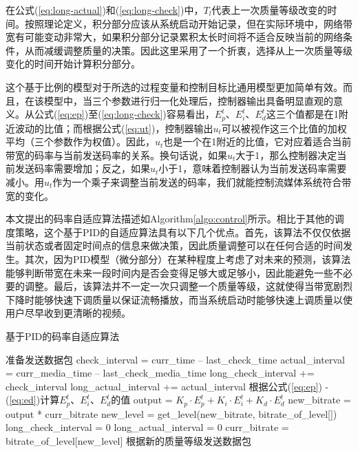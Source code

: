 在公式(\ref{eq:long-actual})和(\ref{eq:long-check})中，$T_l$代表上一次质量等级改变的时间。按照理论定义，积分部分应该从系统启动开始记录，但在实际环境中，网络带宽有可能变动非常大，如果积分部分记录累积太长时间将不适合反映当前的网络条件，从而减缓调整质量的决策。因此这里采用了一个折衷，选择从上一次质量等级变化的时间开始计算积分部分。

这个基于比例的模型对于所选的过程变量和控制目标比通用模型更加简单有效。而且，在该模型中，当三个参数进行归一化处理后，控制器输出具备明显直观的意义。从公式(\ref{eq:ep})至(\ref{eq:long-check})容易看出，$E_p^t$、$E_i^t$、$E_d^t$这三个值都是在1附近波动的比值；而根据公式(\ref{eq:ut})，控制器输出$u_t$可以被视作这三个比值的加权平均（三个参数作为权值）。因此，$u_t$也是一个在1附近的比值，它对应着适合当前带宽的码率与当前发送码率的关系。换句话说，如果$u_t$大于1，那么控制器决定当前发送码率需要增加；反之，如果$u_t$小于1，意味着控制器认为当前发送码率需要减小。用$u_t$作为一个乘子来调整当前发送的码率，我们就能控制流媒体系统符合带宽的变化。

本文提出的码率自适应算法描述如Algorithm\ref{algo:control}所示。相比于其他的调度策略，这个基于PID的自适应算法具有以下几个优点。首先，该算法不仅仅依据当前状态或者固定时间点的信息来做决策，因此质量调整可以在任何合适的时间发生。其次，因为PID模型（微分部分）在某种程度上考虑了对未来的预测，该算法能够判断带宽在未来一段时间内是否会变得足够大或足够小，因此能避免一些不必要的调整。最后，该算法并不一定一次只调整一个质量等级，这就使得当带宽剧烈下降时能够快速下调质量以保证流畅播放，而当系统启动时能够快速上调质量以使用户尽早收到更清晰的视频。

\begin{algorithm}
	\caption{基于PID的码率自适应算法}
	\label{algo:control}
	\begin{algorithmic}
		\STATE 准备发送数据包
		\STATE check\_interval = curr\_time -- last\_check\_time
		\STATE actual\_interval = curr\_media\_time -- last\_check\_media\_time
		\STATE long\_check\_interval += check\_interval
		\STATE long\_actual\_interval += actual\_interval
		\STATE 根据公式(\ref{eq:ep}) - (\ref{eq:ed})计算$E_p^t$、$E_i^t$、$E_d^t$的值
		\STATE output = ${K_p} \cdot E_p^t + {K_i} \cdot E_i^t + {K_d} \cdot E_d^t$
		\STATE new\_bitrate = output * curr\_bitrate
		\STATE new\_level = get\_level(new\_bitrate, bitrate\_of\_level[])
		\STATE long\_check\_interval = 0
		\STATE long\_actual\_interval = 0
		\STATE curr\_bitrate = bitrate\_of\_level[new\_level]
		\ENDIF
		\STATE 根据新的质量等级发送数据包
	\end{algorithmic}
\end{algorithm}

